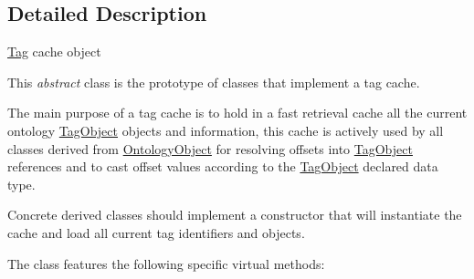 \subsection{Detailed Description}
\hyperlink{class_ontology_wrapper_1_1_tag}{Tag} cache object

This {\itshape abstract} class is the prototype of classes that implement a tag cache.

The main purpose of a tag cache is to hold in a fast retrieval cache all the current ontology \hyperlink{class_ontology_wrapper_1_1_tag_object}{Tag\-Object} objects and information, this cache is actively used by all classes derived from \hyperlink{class_ontology_wrapper_1_1_ontology_object}{Ontology\-Object} for resolving offsets into \hyperlink{class_ontology_wrapper_1_1_tag_object}{Tag\-Object} references and to cast offset values according to the \hyperlink{class_ontology_wrapper_1_1_tag_object}{Tag\-Object} declared data type.

Concrete derived classes should implement a constructor that will instantiate the cache and load all current tag identifiers and objects.

The class features the following specific virtual methods\-:



